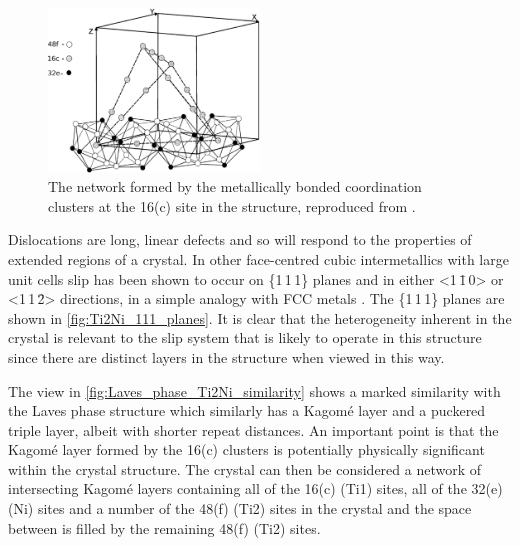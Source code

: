 \begin{figure}
\centering
\includegraphics[width=0.5\textwidth]{Ti2Ni_16c_sites}
\captionsetup{width=0.6\textwidth}
\caption[The Kagom\'{e} network formed by atomic clusters around the 16(c) site.]{The network formed by the metallically bonded coordination clusters at the 16(c) site in the  structure, reproduced from \cite{Ivanovic2006}.\label{fig:16c_network_Ti2Ni}}
\end{figure}


Dislocations are long, linear defects and so will respond to the properties of extended regions of a crystal. In other face-centred cubic intermetallics with large unit cells slip has been shown to occur on \{1\,1\,1\} planes and in either <1\,\={1}\,0> or <1\,1\,\={2}> directions, in a simple analogy with FCC metals \cite{Davis2015}. The \{1\,1\,1\} planes are shown in \autoref{fig:Ti2Ni_111_planes}. It is clear that the heterogeneity inherent in the crystal is relevant to the slip system that is likely to operate in this structure since there are distinct layers in the structure when viewed in this way. 

The view in \autoref{fig:Laves_phase_Ti2Ni_similarity} shows a marked similarity with the Laves phase structure which similarly has a Kagom\'{e} layer and a puckered triple layer, albeit with shorter repeat distances. An important point is that the Kagom\'{e} layer formed by the 16(c) clusters is potentially physically significant within the crystal structure. The crystal can then be considered a network of intersecting Kagom\'e layers containing all of the 16(c) (Ti1) sites, all of the 32(e) (Ni) sites and a number of the 48(f) (Ti2) sites in the crystal and the space between is filled by the remaining 48(f) (Ti2) sites.


